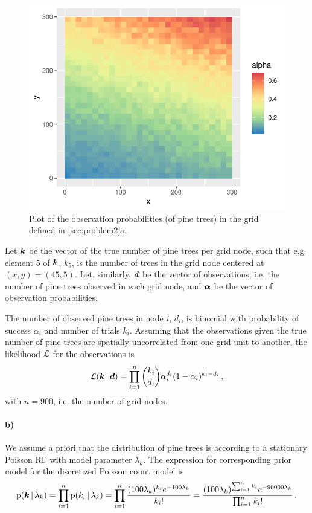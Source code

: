 \begin{figure}
    \centering
    \includegraphics{figures/p2_alpha.pdf}
    \caption{Plot of the observation probabilities (of pine trees) in the grid defined in \ref{sec:problem2}a.}
    \label{fig:p2_alpha}
\end{figure}

Let $\bm{k}$ be the vector of the true number of pine trees per grid node, such that e.g. element 5 of $\bm{k}$, $k_5$, is the number of trees in the grid node centered at $(x, y) = (45, 5)$. Let, similarly, $\bm{d}$ be the vector of observations, i.e. the number of pine trees observed in each grid node, and $\bm{\alpha}$ be the vector of observation probabilities.

The number of observed pine trees in node $i$, $d_i$, is binomial with probability of success $\alpha_i$ and number of trials $k_i$. Assuming that the observations given the true number of pine trees are spatially uncorrelated from one grid unit to another, the likelihood $\mathcal{L}$ for the observations is
%
\begin{equation*}
    \mathcal{L}(\bm{k} \, | \, \bm{d}) = \prod_{i=1}^n \binom{k_i}{d_i} \alpha_i^{d_i} (1 - \alpha_i)^{k_i - d_i} \, ,
\end{equation*}
%
with $n=900$, i.e. the number of grid nodes.

\paragraph{b)}
We assume a priori that the distribution of pine trees is according to a stationary Poisson RF with model parameter $\lambda_k$. The expression for corresponding prior model for the discretized Poisson count model is
%
\begin{equation*}
    \mathrm{p}(\bm{k} \, | \, \lambda_k) = \prod_{i=1}^n \mathrm{p}(k_i \, | \, \lambda_k) = \prod_{i=1}^n \frac{(100\lambda_k)^{k_i} e^{-100\lambda_k}}{k_i!} = \frac{(100\lambda_k)^{\sum_{i=1}^n k_i} e^{-90000\lambda_k}}{\prod_{i=1}^n k_i!} \, .
\end{equation*}


